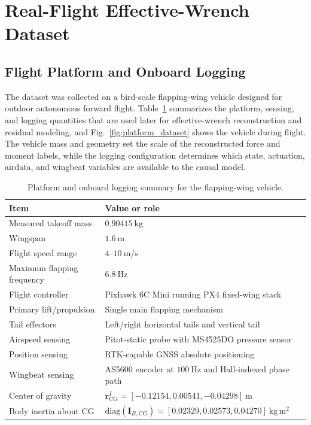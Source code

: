 \section{Real-Flight Effective-Wrench Dataset}
\label{sec:dataset}

\subsection{Flight Platform and Onboard Logging}
\label{subsec:platform_logging}

The dataset was collected on a bird-scale flapping-wing vehicle designed for outdoor autonomous forward flight. Table~\ref{tab:platform_params} summarizes the platform, sensing, and logging quantities that are used later for effective-wrench reconstruction and residual modeling, and Fig.~\ref{fig:platform_dataset} shows the vehicle during flight. The vehicle mass and geometry set the scale of the reconstructed force and moment labels, while the logging configuration determines which state, actuation, airdata, and wingbeat variables are available to the causal model.

\begin{table}[t]
\caption{Platform and onboard logging summary for the flapping-wing vehicle.}
\label{tab:platform_params}
\centering
\begin{tabular}{@{}p{}p{}@{}}
\toprule
Item & Value or role \\
\midrule
Measured takeoff mass & $0.90415~\mathrm{kg}$ \\
Wingspan & $1.6~\mathrm{m}$ \\
Flight speed range & $4$--$10~\mathrm{m/s}$ \\
Maximum flapping frequency & $6.8~\mathrm{Hz}$ \\
Flight controller & Pixhawk 6C Mini running PX4 fixed-wing stack \\
Primary lift/propulsion & Single main flapping mechanism \\
Tail effectors & Left/right horizontal tails and vertical tail \\
Airspeed sensing & Pitot-static probe with MS4525DO pressure sensor \\
Position sensing & RTK-capable GNSS absolute positioning \\
Wingbeat sensing & AS5600 encoder at $100~\mathrm{Hz}$ and Hall-indexed phase path \\
Center of gravity & $\mathbf{r}_{\mathrm{CG}}^{I}=[-0.12154,0.00541,-0.04298]~\mathrm{m}$ \\
Body inertia about CG & $\mathrm{diag}(\mathbf{I}_{B,\mathrm{CG}})=[0.02329,0.02573,0.04270]~\mathrm{kg\,m^2}$ \\
\bottomrule
\end{tabular}
\end{table}

